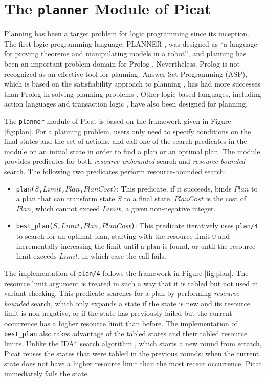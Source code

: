 \documentclass{new_tlp}
\begin{document}
\section{The {\tt planner} Module of Picat}
Planning has been a target problem for logic programming since its inception. The first logic programming language, PLANNER \cite{Hewitt69}, was designed as ``a language for proving theorems and manipulating models in a robot'', and planning has been an important problem domain for Prolog \cite{Kowalski79,warplan}. Nevertheless, Prolog is not recognized as an effective tool for planning. Answer Set Programming (ASP), which is based on the satisfiability approach to planning \cite{KautzS92,Rintanen12}, has had more successes than Prolog in solving planning problems \cite{Lifschitz02,gekakasc12a}. Other logic-based languages, including action languages \cite{DFP11} and transaction logic \cite{FodorK10}, have also been designed for planning.

The {\tt planner} module of Picat is based on the framework given in Figure \ref{fig:plan}. For a planning problem, users only need to specify conditions on the final states and the set of actions, and call one of the search predicates in the module on an initial state in order to find a plan or an optimal plan. The module provides predicates for both {\it resource-unbounded} search and {\it resource-bounded} search. The following two predicates perform resource-bounded search:

\begin{itemize}
\item \texttt{plan($S$,$Limit$,$Plan$,$PlanCost$)}: This predicate, if it succeeds, binds $Plan$ to a plan that can transform state $S$ to a final state. $PlanCost$ is the cost of $Plan$, which cannot exceed $Limit$, a given non-negative integer. 

\item \texttt{best\_plan($S$,$Limit$,$Plan$,$PlanCost$)}: This predicate iteratively uses {\tt plan/4} to search for an optimal plan, starting with the resource limit 0 and incrementally increasing the limit until a plan is found, or until the resource limit exceeds $Limit$, in which case the call fails. 
\end{itemize}

The implementation of {\tt plan/4} follows the framework in Figure \ref{fig:plan}. The resource limit argument is treated in such a way that it is tabled but not used in variant checking. This predicate searches for a plan by performing {\it resource-bounded} search, which only expands a state if the state is new and its resource limit is non-negative, or if the state has previously failed but the current occurrence has a higher resource limit than before. The implementation of {\tt best\_plan} also takes advantage of the tabled states and their tabled resource limits. Unlike the IDA* search algorithm \cite{Korf85}, which starts a new round from scratch, Picat reuses the states that were tabled in the previous rounds: when the current state does not have a higher resource limit than the most recent occurrence, Picat immediately fails the state.
\end{document}
